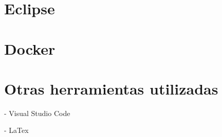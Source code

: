 

\section{Eclipse}



\section{Docker}




\section{Otras herramientas utilizadas}

- Visual Studio Code

- LaTex


